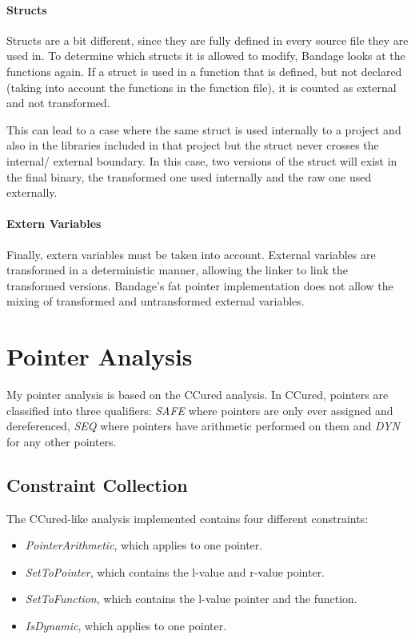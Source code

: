 \paragraph{Structs}
Structs are a bit different, since they are fully defined in every source file they are used in.
To determine which structs it is allowed to modify, Bandage looks at the functions again.
If a struct is used in a function that is defined, but not declared (taking into account the functions in the function file), it is counted as external and not transformed.

This can lead to a case where the same struct is used internally to a project and also in the libraries included in that project but the struct never crosses the internal/ external boundary.
In this case, two versions of the struct will exist in the final binary, the transformed one used internally and the raw one used externally.

\paragraph{Extern Variables}
Finally, extern variables must be taken into account.
External variables are transformed in a deterministic manner, allowing the linker to link the transformed versions.
Bandage's fat pointer implementation does not allow the mixing of transformed and untransformed external variables.
\section{Pointer Analysis}

My pointer analysis is based on the CCured analysis.
In CCured, pointers are classified into three qualifiers: \textit{SAFE} where pointers are only ever assigned and dereferenced, \textit{SEQ} where pointers have arithmetic performed on them and \textit{DYN} for any other pointers.

\subsection{Constraint Collection}

The CCured-like analysis implemented contains four different constraints:
\begin{itemize}
\item \textit{PointerArithmetic}, which applies to one pointer.
\item \textit{SetToPointer}, which contains the l-value and r-value pointer.
\item \textit{SetToFunction}, which contains the l-value pointer and the function.
\item \textit{IsDynamic}, which applies to one pointer.
\end{itemize}


